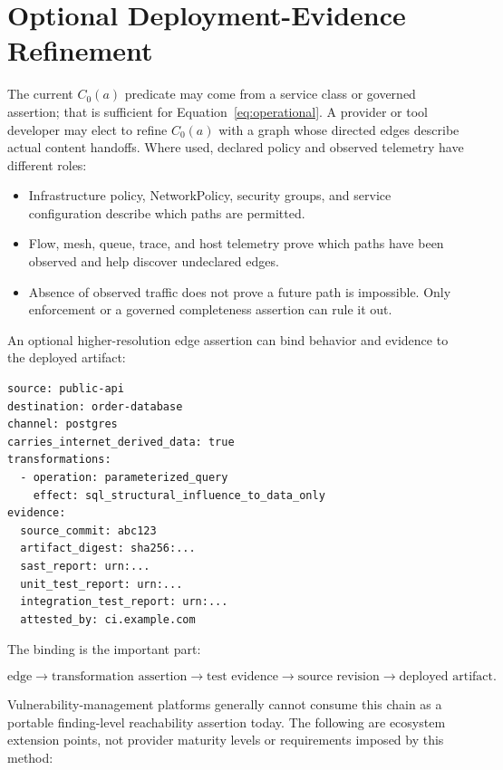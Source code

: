 \documentclass[11pt]{article}
\begin{document}
\section{Optional Deployment-Evidence Refinement}
\label{sec:evidence-plane}
The current $C_0(a)$ predicate may come from a service class or governed
assertion; that is sufficient for Equation~\ref{eq:operational}. A provider or
tool developer may elect to refine $C_0(a)$ with a graph whose directed edges
describe actual content handoffs. Where used, declared policy and observed
telemetry have different roles:

\begin{itemize}[leftmargin=1.5em]
\item Infrastructure policy, NetworkPolicy, security groups, and service
  configuration describe which paths are permitted.
\item Flow, mesh, queue, trace, and host telemetry prove which paths have been
  observed and help discover undeclared edges.
\item Absence of observed traffic does not prove a future path is impossible.
  Only enforcement or a governed completeness assertion can rule it out.
\end{itemize}

An optional higher-resolution edge assertion can bind behavior and evidence to
the deployed artifact:

\begin{verbatim}
source: public-api
destination: order-database
channel: postgres
carries_internet_derived_data: true
transformations:
  - operation: parameterized_query
    effect: sql_structural_influence_to_data_only
evidence:
  source_commit: abc123
  artifact_digest: sha256:...
  sast_report: urn:...
  unit_test_report: urn:...
  integration_test_report: urn:...
  attested_by: ci.example.com
\end{verbatim}

The binding is the important part:

\[
\text{edge}\rightarrow\text{transformation assertion}
\rightarrow\text{test evidence}\rightarrow\text{source revision}
\rightarrow\text{deployed artifact}.
\]

Vulnerability-management platforms generally cannot consume this chain as a
portable finding-level reachability assertion today. The following are
ecosystem extension points, not provider maturity levels or requirements
imposed by this method:
\end{document}
